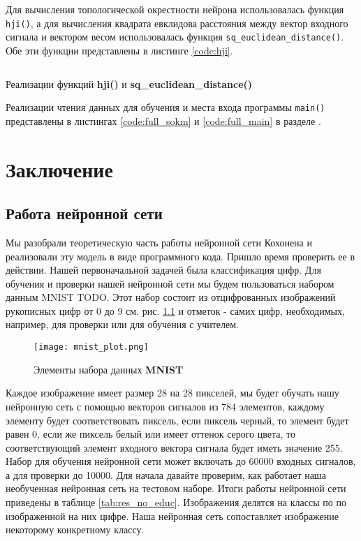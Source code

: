 \documentclass[a4paper,12pt]{report}
\begin{document}
Для вычисления топологической окрестности нейрона использовалась
функция \verb|hji()|, а для вычисления квадрата евклидова расстояния
между вектор входного сигнала и вектором весом использовалась функция
\verb|sq_euclidean_distance()|. Обе эти функции представлены в листинге
\ref{code:hji}.

\begin{code}
    \inputminted{cpp}{code/train.hpp}
    \caption{Реализации функций \textbf{hji()} и \textbf{sq\_euclidean\_distance()}}
    \label{code:hji}
\end{code}
\vspace{5mm}

Реализации чтения данных для обучения и места входа программы \verb|main()|
представлены в листингах \ref{code:full_sokm}
и \ref{code:full_main} в разделе .

\chapter{Заключение}
\section{Работа нейронной сети}
Мы разобрали теоретическую часть работы нейронной сети Кохонена и
реализовали эту модель в виде программного кода. Пришло время
проверить ее в действии. Нашей первоначальной задачей была
классификация цифр. Для обучения и проверки нашей нейронной сети мы
будем пользоваться набором данным MNIST TODO. Этот набор состоит из
отцифрованных изображений
рукописных цифр от 0 до 9 см. рис. \ref{fig:mnist_ex} и отметок -
самих цифр, необходимых, например, для проверки или для обучения с
учителем.

\begin{figure}[!htb]
    \centering
    \captionsetup{justification=centering}
    \texttt{[image: mnist\_plot.png]}
    \caption{Элементы набора данных \textbf{MNIST}}
    \label{fig:mnist_ex}
\end{figure}

Каждое изображение имеет размер 28 на 28 пикселей, мы будет
обучать нашу нейронную сеть с помощью векторов сигналов из 784
элементов, каждому элементу будет соответствовать пиксель, если
пиксель черный, то элемент будет равен 0, если же пиксель белый или
имеет оттенок серого цвета, то соответствующий элемент входного
вектора сигнала будет иметь значение 255. Набор для обучения нейронной
сети может включать до 60000 входных сигналов, а для проверки до
10000. Для начала давайте проверим, как работает наша необученная
нейронная сеть на тестовом наборе. Итоги работы нейронной сети
приведены в таблице \ref{tab:res_no_educ}. Изображения делятся на классы по по
изображенной на них цифре. Наша нейронная сеть сопоставляет
изображение некоторому конкретному классу.
\end{document}
